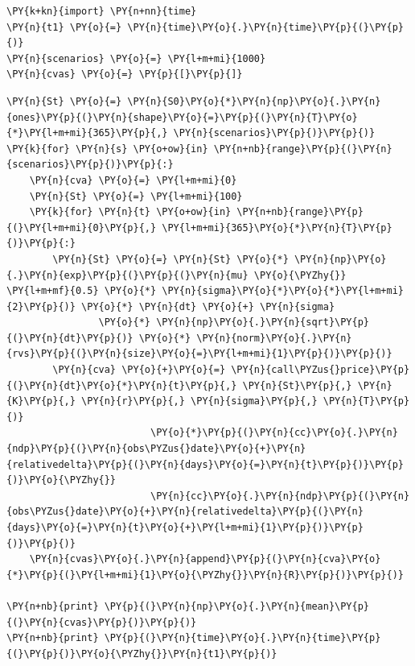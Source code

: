 \begin{Answer}
\begin{tcolorbox}[size=fbox, boxrule=1pt, colback=cellbackground, colframe=cellborder]
\begin{Verbatim}[commandchars=\\\{\}]
\PY{k+kn}{import} \PY{n+nn}{time}
\PY{n}{t1} \PY{o}{=} \PY{n}{time}\PY{o}{.}\PY{n}{time}\PY{p}{(}\PY{p}{)}
\PY{n}{scenarios} \PY{o}{=} \PY{l+m+mi}{1000}
\PY{n}{cvas} \PY{o}{=} \PY{p}{[}\PY{p}{]}
\end{Verbatim}
\end{tcolorbox}

\begin{tcolorbox}[size=fbox, boxrule=1pt, colback=cellbackground, colframe=cellborder]
\begin{Verbatim}[commandchars=\\\{\}]
\PY{n}{St} \PY{o}{=} \PY{n}{S0}\PY{o}{*}\PY{n}{np}\PY{o}{.}\PY{n}{ones}\PY{p}{(}\PY{n}{shape}\PY{o}{=}\PY{p}{(}\PY{n}{T}\PY{o}{*}\PY{l+m+mi}{365}\PY{p}{,} \PY{n}{scenarios}\PY{p}{)}\PY{p}{)}    
\PY{k}{for} \PY{n}{s} \PY{o+ow}{in} \PY{n+nb}{range}\PY{p}{(}\PY{n}{scenarios}\PY{p}{)}\PY{p}{:}
    \PY{n}{cva} \PY{o}{=} \PY{l+m+mi}{0}
    \PY{n}{St} \PY{o}{=} \PY{l+m+mi}{100}
    \PY{k}{for} \PY{n}{t} \PY{o+ow}{in} \PY{n+nb}{range}\PY{p}{(}\PY{l+m+mi}{0}\PY{p}{,} \PY{l+m+mi}{365}\PY{o}{*}\PY{n}{T}\PY{p}{)}\PY{p}{:} 
        \PY{n}{St} \PY{o}{=} \PY{n}{St} \PY{o}{*} \PY{n}{np}\PY{o}{.}\PY{n}{exp}\PY{p}{(}\PY{p}{(}\PY{n}{mu} \PY{o}{\PYZhy{}} \PY{l+m+mf}{0.5} \PY{o}{*} \PY{n}{sigma}\PY{o}{*}\PY{o}{*}\PY{l+m+mi}{2}\PY{p}{)} \PY{o}{*} \PY{n}{dt} \PY{o}{+} \PY{n}{sigma} 
                \PY{o}{*} \PY{n}{np}\PY{o}{.}\PY{n}{sqrt}\PY{p}{(}\PY{n}{dt}\PY{p}{)} \PY{o}{*} \PY{n}{norm}\PY{o}{.}\PY{n}{rvs}\PY{p}{(}\PY{n}{size}\PY{o}{=}\PY{l+m+mi}{1}\PY{p}{)}\PY{p}{)}
        \PY{n}{cva} \PY{o}{+}\PY{o}{=} \PY{n}{call\PYZus{}price}\PY{p}{(}\PY{n}{dt}\PY{o}{*}\PY{n}{t}\PY{p}{,} \PY{n}{St}\PY{p}{,} \PY{n}{K}\PY{p}{,} \PY{n}{r}\PY{p}{,} \PY{n}{sigma}\PY{p}{,} \PY{n}{T}\PY{p}{)}
                         \PY{o}{*}\PY{p}{(}\PY{n}{cc}\PY{o}{.}\PY{n}{ndp}\PY{p}{(}\PY{n}{obs\PYZus{}date}\PY{o}{+}\PY{n}{relativedelta}\PY{p}{(}\PY{n}{days}\PY{o}{=}\PY{n}{t}\PY{p}{)}\PY{p}{)}\PY{o}{\PYZhy{}}
                         \PY{n}{cc}\PY{o}{.}\PY{n}{ndp}\PY{p}{(}\PY{n}{obs\PYZus{}date}\PY{o}{+}\PY{n}{relativedelta}\PY{p}{(}\PY{n}{days}\PY{o}{=}\PY{n}{t}\PY{o}{+}\PY{l+m+mi}{1}\PY{p}{)}\PY{p}{)}\PY{p}{)}        
    \PY{n}{cvas}\PY{o}{.}\PY{n}{append}\PY{p}{(}\PY{n}{cva}\PY{o}{*}\PY{p}{(}\PY{l+m+mi}{1}\PY{o}{\PYZhy{}}\PY{n}{R}\PY{p}{)}\PY{p}{)}
		
\PY{n+nb}{print} \PY{p}{(}\PY{n}{np}\PY{o}{.}\PY{n}{mean}\PY{p}{(}\PY{n}{cvas}\PY{p}{)}\PY{p}{)}
\PY{n+nb}{print} \PY{p}{(}\PY{n}{time}\PY{o}{.}\PY{n}{time}\PY{p}{(}\PY{p}{)}\PY{o}{\PYZhy{}}\PY{n}{t1}\PY{p}{)}
\end{Verbatim}
\end{tcolorbox}


\end{Answer}
